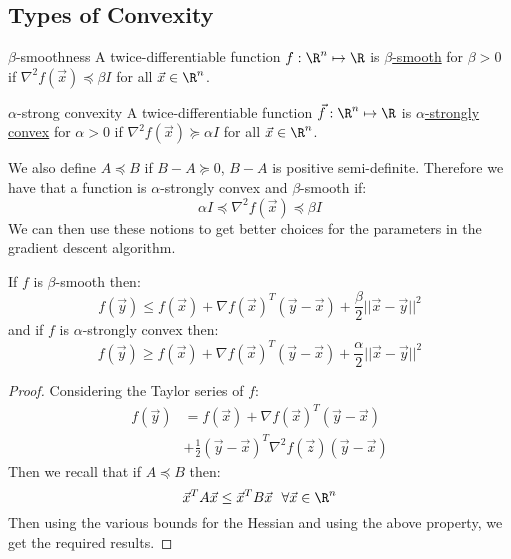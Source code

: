 \documentclass[../Main.tex]{subfiles}
\begin{document}
\subsection{Types of Convexity}
\begin{definition}{$\beta$-smoothness}
    A twice-differentiable function $f : \R^n \mapsto \R$ is \underline{$\beta$-smooth} for $\beta > 0$ if $\nabla^2 f(\vec{x}) \preceq \beta I$ for all $\vec{x} \in \R^n$.
\end{definition}
\begin{definition}{$\alpha$-strong convexity}
    A twice-differentiable function $\vec{f} : \R^n \mapsto \R$ is \underline{$\alpha$-strongly convex} for $\alpha > 0$ if $\nabla^2 f(\vec{x}) \succeq \alpha I$ for all $\vec{x} \in \R^n$.
\end{definition}
We also define $A \preceq B$ if $B - A \succeq 0$, $B - A$ is positive semi-definite. Therefore we have that a function is $\alpha$-strongly convex and $\beta$-smooth if:
\begin{equation*}
    \alpha I \preceq \nabla^2 f(\vec{x}) \preceq \beta I
\end{equation*}
We can then use these notions to get better choices for the parameters in the gradient descent algorithm.
\begin{theorem}
    If $f$ is $\beta$-smooth then:
    \begin{equation}
        f(\vec{y}) \leq f(\vec{x}) + \nabla f(\vec{x})^T (\vec{y} - \vec{x}) + \frac{\beta}{2} ||\vec{x} - \vec{y}||^2
        \label{eqnBetaSmoothBound}
    \end{equation}
    and if $f$ is $\alpha$-strongly convex then:
    \begin{equation}
        f(\vec{y}) \geq f(\vec{x}) + \nabla f(\vec{x})^T (\vec{y} - \vec{x}) + \frac{\alpha}{2} ||\vec{x} - \vec{y}||^2
        \label{eqnAlphaStrongBound}
    \end{equation}
    \label{thmConvexityBounds}
\end{theorem}
\begin{proof}
    Considering the Taylor series of $f$:
    \begin{align*}
        f(\vec{y}) &= f(\vec{x}) + \nabla f(\vec{x})^T (\vec{y} - \vec{x}) \\
        &+ \frac{1}{2} (\vec{y} - \vec{x})^T \nabla^2 f(\vec{z}) (\vec{y} - \vec{x})
    \end{align*}
    Then we recall that if $A \preceq B$ then:
    \begin{equation*}
        \vec{x}^T A \vec{x} \leq \vec{x}^T B \vec{x}~~\forall \vec{x} \in \R^n
    \end{equation*}
    Then using the various bounds for the Hessian and using the above property, we get the required results.
\end{proof}
\end{document}
